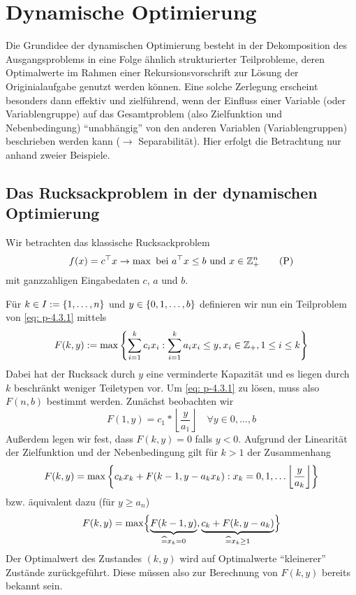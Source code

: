 \section{Dynamische Optimierung}

Die Grundidee der dynamischen Optimierung  besteht in der Dekomposition des Ausgangsproblems in eine Folge ähnlich strukturierter Teilprobleme, deren Optimalwerte im Rahmen einer Rekursionsvorschrift zur Lösung der Originialaufgabe genutzt werden können. Eine solche Zerlegung erscheint besonders dann effektiv und zielführend, wenn der Einfluss einer Variable (oder Variablengruppe) auf das Gesamtproblem (also Zielfunktion und Nebenbedingung) \enquote{unabhängig} von den anderen Variablen (Variablengruppen) beschrieben werden kann ($\to$ Separabilität). Hier erfolgt die Betrachtung nur anhand zweier Beispiele.

\subsection{Das Rucksackproblem in der dynamischen Optimierung}
Wir betrachten das klassische Rucksackproblem 
\begin{equation*}
	f(x) = c^{\top} x \to \max \text{ bei } a^{\top}x \le b \text{ und } x \in \mathbb{Z}_+^n \tag{P} \label{eq: p-4.3.1}
\end{equation*}
mit ganzzahligen Eingabedaten $c$, $a$ und $b$.

Für $k \in I \mathrel{:=} \left\{ 1, \dots, n \right\}$ und $y \in \left\{ 0,1,\dots, b \right\}$ definieren wir nun ein Teilproblem von \eqref{eq: p-4.3.1} mittels
\begin{equation*}
	F(k,y) \mathrel{:=} \max\left\{ \sum_{i=1}^k c_i x_i : \sum_{i=1}^k a_i x_i \le y, x_i \in \mathbb{Z}_+, 1 \le i \le k \right\}
\end{equation*}
Dabei hat der Rucksack durch $y$ eine verminderte Kapazität und es liegen durch $k$ beschränkt weniger Teiletypen vor.
Um \eqref{eq: p-4.3.1} zu lösen, muss also $F(n,b)$ bestimmt werden.
Zunächst beobachten wir
\begin{equation*}
	F(1,y) = c_1 * \left\lfloor \frac{y}{a_1} \right\rfloor \quad \forall y \in {0, \dots, b}
\end{equation*}
Außerdem legen wir fest, dass $F(k,y) = 0$ falls $y < 0$.
Aufgrund der Linearität der Zielfunktion und der Nebenbedingung gilt für $k > 1$ der Zusammenhang
\begin{equation*}
	F(k,y) = \max\left\{ c_k x_k + F(k-1, y-a_k x_k): x_k = 0,1,\dots \left\lfloor \frac{y}{a_k} \right\rfloor \right\}
\end{equation*}
bzw. äquivalent dazu (für $y \ge a_n$)
\begin{equation}
	F(k,y) = \max \Bigl\{  \underbrace{F(k-1,y)}_{\widehat{=} x_k = 0}, \underbrace{c_k + F(k,y-a_k)}_{\widehat{=} x_k \ge 1} \Bigr\}
	\label{eq: 4.6}
\end{equation}
Der Optimalwert des Zustandes $(k,y)$ wird auf Optimalwerte \enquote{kleinerer} Zustände zurückgeführt. Diese müssen also zur Berechnung von $F(k,y)$ bereits bekannt sein.

